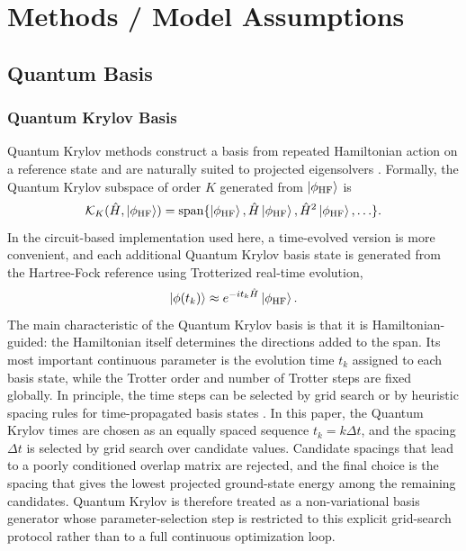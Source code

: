 \section{Methods / Model Assumptions}

\subsection{Quantum Basis}

\subsubsection{Quantum Krylov Basis}

Quantum Krylov methods construct a basis from repeated Hamiltonian action on a reference state and are naturally suited to projected eigensolvers \cite{cortes2022qksd}. Formally, the Quantum Krylov subspace of order $K$ generated from $\ket{\phi_{\mathrm{HF}}}$ is
\begin{equation}
\mathcal{K}_K(\hat{H}, \ket{\phi_{\mathrm{HF}}}) =
\mathrm{span}\{\ket{\phi_{\mathrm{HF}}}, \hat{H}\ket{\phi_{\mathrm{HF}}}, \hat{H}^2\ket{\phi_{\mathrm{HF}}}, \ldots \}.
\end{equation}
In the circuit-based implementation used here, a time-evolved version is more convenient, and each additional Quantum Krylov basis state is generated from the Hartree-Fock reference using Trotterized real-time evolution,
\begin{equation}
\ket{\phi(t_k)} \approx e^{-it_k\hat{H}}\ket{\phi_{\mathrm{HF}}}.
\end{equation}
The main characteristic of the Quantum Krylov basis is that it is Hamiltonian-guided: the Hamiltonian itself determines the directions added to the span. Its most important continuous parameter is the evolution time $t_k$ assigned to each basis state, while the Trotter order and number of Trotter steps are fixed globally. In principle, the time steps can be selected by grid search or by heuristic spacing rules for time-propagated basis states \cite{stair2020mrsqk,cohn2021qfd}. In this paper, the Quantum Krylov times are chosen as an equally spaced sequence $t_k = k\Delta t$, and the spacing $\Delta t$ is selected by grid search over candidate values. Candidate spacings that lead to a poorly conditioned overlap matrix are rejected, and the final choice is the spacing that gives the lowest projected ground-state energy among the remaining candidates. Quantum Krylov is therefore treated as a non-variational basis generator whose parameter-selection step is restricted to this explicit grid-search protocol rather than to a full continuous optimization loop.

